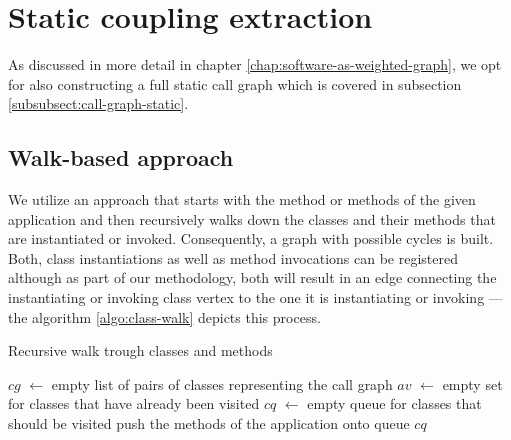 \documentclass[12pt,a4paper]{report}
\begin{document}
\section{Static coupling extraction} \label{sect:static-coupling-extraction}

As discussed in more detail in chapter \ref{chap:software-as-weighted-graph},
we opt for also constructing a full static call graph which is covered
in subsection \ref{subsubsect:call-graph-static}.


\subsection{Walk\hyp based approach}

We utilize an approach that starts with the  method or methods of
the given application and then recursively walks down the classes and their
methods that are instantiated or invoked. Consequently, a graph with
possible cycles is built.
Both, class instantiations as well as method invocations can be registered
although as part of our methodology, both  will result in an edge connecting
the instantiating or invoking class vertex to the one it is instantiating
or invoking --- the algorithm \ref{algo:class-walk} depicts this process.

\begin{algorithm}[ht]
\caption{Recursive walk trough classes and methods}
\label{algo:class-walk}
  \BlankLine
  \BlankLine
  $cg$ $\leftarrow$ empty list of pairs of classes representing the call graph\;
  $av$ $\leftarrow$ empty set for classes that have already been visited\;
  $cq$ $\leftarrow$ empty queue for classes that should be visited\;
  \BlankLine
  push the  methods of the application onto queue $cq$\;
  \BlankLine
  \BlankLine
  \;
\end{algorithm}
\end{document}
